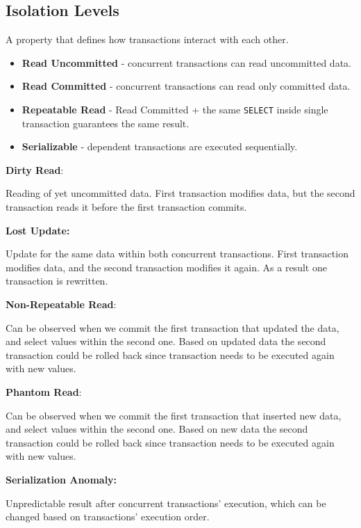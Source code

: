 \documentclass{article}
\newcommand{\code}[1]{\colorbox{light-gray}{\texttt{#1}}}
\begin{document}
\subsection{Isolation Levels}
\noindent

A property that defines how transactions interact with each other.

\begin{itemize}
  \item \textbf{Read Uncommitted} - concurrent transactions can read uncommitted data.
  \item \textbf{Read Committed} - concurrent transactions can read only committed data.
  \item \textbf{Repeatable Read} - Read Committed + the same \code{SELECT} inside single transaction guarantees the same result.
  \item \textbf{Serializable} - dependent transactions are executed sequentially.
\end{itemize}

\textbf{Dirty Read}:

Reading of yet uncommitted data. First transaction modifies data, but the second transaction reads it before the first transaction commits.

\textbf{Lost Update:} 

Update for the same data within both concurrent transactions. First transaction modifies data, and the second transaction modifies it again. As a result one transaction is rewritten.

\textbf{Non-Repeatable Read}:

Can be observed when we commit the first transaction that updated the data, and select values within the second one. Based on updated data the second transaction could be rolled back since transaction needs to be executed again with new values.

\textbf{Phantom Read}:

Can be observed when we commit the first transaction that inserted new data, and select values within the second one. Based on new data the second transaction could be rolled back since transaction needs to be executed again with new values.

\textbf{Serialization Anomaly:} 

Unpredictable result after concurrent transactions' execution, which can be changed based on transactions' execution order.
\end{document}

